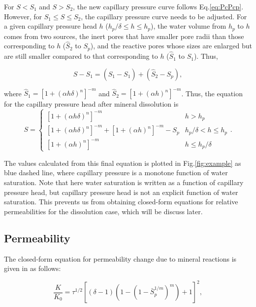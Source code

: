 \documentclass[preprint,12pt,authoryear]{elsarticle}
\begin{document}
For $S<S_1$ and $S>S_2$, the new capillary pressure curve follows Eq.\ref{eq:PcPcp}. However, for $S_1\leq S\leq S_2$, the capillary pressure curve needs to be adjusted. For a given capillary pressure head $h$ ($h_p/\delta\leq h\leq h_p$), the water volume from $h_p$ to $h$ comes from two sources, the inert pores that have smaller pore radii than those corresponding to $h$ ($\hat{S}_2$ to $S_p$), and the reactive pores whose sizes are enlarged but are still smaller compared to that corresponding to $h$ ($\hat{S}_1$ to $S_1$). Thus,

\begin{equation}
\label{eq:S-S1}
S-S_1=(\hat{S}_1-S_1)+(\hat{S}_2-S_p),
\end{equation} 

where $\hat{S}_1=[1+(\alpha h\delta)^n]^{-m}$ and $\hat{S}_2=[1+(\alpha h)^n]^{-m}$. Thus, the equation for the capillary pressure head after mineral dissolution is
\begin{equation}
\label{eq:PcDss}
S= \begin{cases} 
      [1+(\alpha h\delta)^n]^{-m} &h > h_p\\
      [1+(\alpha h\delta)^n]^{-m}+[1+(\alpha h)^n]^{-m}-S_p &h_p /\delta< h \leq h_p \\
      [1+(\alpha h)^n]^{-m} & h \leq h_p / \delta
   \end{cases}.
\end{equation}

The values calculated from this final equation is plotted in Fig.\ref{fig:example} as blue dashed line, where capillary pressure is a monotone function of water saturation. Note that here water saturation is written as a function of capillary pressure head, but capillary pressure head is not an explicit function of water saturation. This prevents us from obtaining closed-form equations for relative permeabilities for the dissolution case, which will be discuss later.

\subsection{Permeability}

The closed-form equation for permeability change due to mineral reactions is given in \cite{liu2013permeability} as follows:

\begin{equation}
\label{eq:liu}
\dfrac{K}{K_0}=\tau^{1/2}[(\delta-1)(1-(1-\bar{S}_p^{1/m})^m)+1]^2,
\end{equation}
\end{document}
